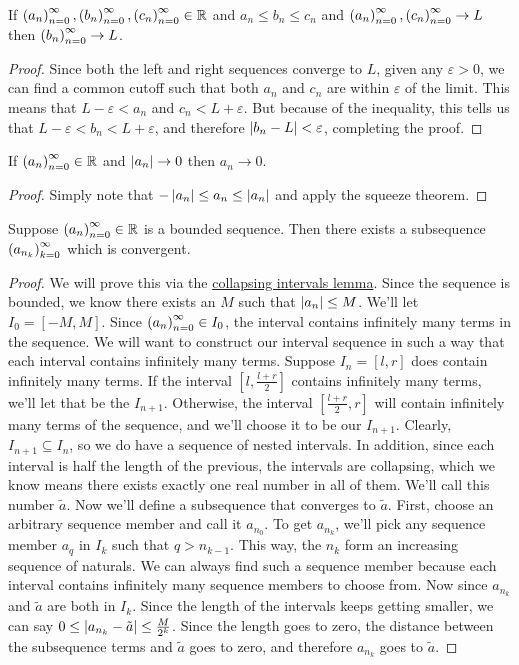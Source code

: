 \begin{theorem}
If $\seq{a},\seq{b},\seq{c} \in \mathbb{R}$ and $a_n \leq b_n \leq c_n$ and $\seq{a}, \seq{c} \to L$ then $\seq{b} \to L$.
\end{theorem}
\begin{proof}
Since both the left and right sequences converge to $L$, given any $\varepsilon > 0$, we can find a common cutoff such that both $a_n$ and $c_n$ are within $\varepsilon$ of the limit. This means that $L-\varepsilon < a_n$ and $c_n < L+\varepsilon$. But because of the inequality, this tells us that $L-\varepsilon < b_n < L+\varepsilon$, and therefore $\left\lvert b_n - L \right\rvert < \varepsilon$, completing the proof.
\end{proof}
\begin{corollary}
If $\seq{a} \in \mathbb{R}$ and $\left\lvert a_n \right\rvert \to 0$ then $a_n \to 0$.
\end{corollary}
\begin{proof}
Simply note that $-\left\lvert a_n \right\rvert \leq a_n \leq \left\lvert a_n \right\rvert$ and apply the squeeze theorem.
\end{proof}
\begin{theorem}
Suppose $\seq{a} \in \mathbb{R}$ is a bounded sequence. Then there exists a subsequence $\seq{a}[n_k][k]$ which is convergent. 
\end{theorem}
\begin{proof}
We will prove this via the \hyperlink{Collapsing Intervals Lemma}{collapsing intervals lemma}. Since the sequence is bounded, we know there exists an $M$ such that $\left\lvert a_n \right\rvert \leq M$. We'll let $I_0 = [-M, M]$. Since $\seq{a} \in I_0$, the interval contains infinitely many terms in the sequence. We will want to construct our interval sequence in such a way that each interval contains infinitely many terms. Suppose $I_n = [l, r]$ does contain infinitely many terms. If the interval $[l, \frac{l+r}{2}]$ contains infinitely many terms, we'll let that be the $I_{n+1}$. Otherwise, the interval $[\frac{l+r}{2}, r]$ will contain infinitely many terms of the sequence, and we'll choose it to be our $I_{n+1}$. Clearly, $I_{n+1} \subseteq I_n$, so we do have a sequence of nested intervals. In addition, since each interval is half the length of the previous, the intervals are collapsing, which we know means there exists exactly one real number in all of them. We'll call this number $\tilde{a}$. Now we'll define a subsequence that converges to $\tilde{a}$.
First, choose an arbitrary sequence member and call it $a_{n_0}$. To get $a_{n_k}$, we'll pick any sequence member $a_q$ in $I_k$ such that $q > n_{k-1}$. This way, the $n_k$ form an increasing sequence of naturals. We can always find such a sequence member because each interval contains infinitely many sequence members to choose from. Now since $a_{n_k}$ and $\tilde{a}$ are both in $I_k$. Since the length of the intervals keeps getting smaller, we can say $0 \leq \left\lvert a_{n_k} - \tilde{a} \right\rvert \leq \frac{M}{2^k}$. Since the length goes to zero, the distance between the subsequence terms and $\tilde{a}$ goes to zero, and therefore $a_{n_k}$ goes to $\tilde{a}$.
\end{proof}
